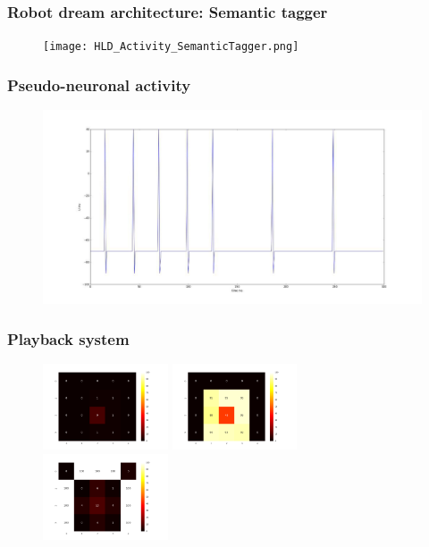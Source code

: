 \documentclass[12pt, aspectratio=169]{beamer}
\begin{document}

\begin{frame}
\frametitle{Robot dream architecture: Semantic tagger}
\begin{figure}
\texttt{[image: HLD\_Activity\_SemanticTagger.png]}
\end{figure}
\end{frame}


\begin{frame}
\frametitle{Pseudo-neuronal activity}
\begin{figure}
\includegraphics[width=0.8\linewidth]{pseudo-neuronal-activity}
\end{figure}
\end{frame}


\begin{frame}
\frametitle{Playback system}
\begin{figure}
\includegraphics[width=0.33\textwidth]{layer5A_1}
\includegraphics[width=0.33\textwidth]{layer5A_2}
\includegraphics[width=0.33\textwidth]{layer5A_3}
\end{figure}
\end{frame}
\end{document}
